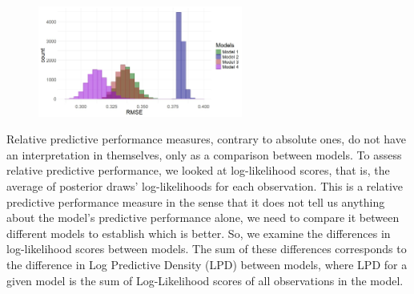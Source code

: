 \documentclass[12pt]{article}
\newcommand{\blue}[1]{\textcolor{blue}{#1}}
\begin{document}
\begin{figure}[h]
	\centering
	\includegraphics[width=0.6\textwidth]{model_comp_figures/RMSE_all.jpeg}
	\caption{}
	\label{fig:rmse}
\end{figure}

%
%






Relative predictive performance measures, contrary to absolute ones, do not have an interpretation in themselves, only as a comparison between models. 
To assess relative predictive performance, we looked at log-likelihood scores, that is, the average of posterior draws' log-likelihoods for each observation.
This is a relative predictive performance measure in the sense that it does not tell us anything about the model's predictive performance alone, we need to compare it between different models to establish which is better. So, we examine the differences in log-likelihood scores between models.
The sum of these differences corresponds to the difference in Log Predictive Density (LPD) between models, where LPD for a given model is the sum of Log-Likelihood scores of all observations in the model.
\end{document}
